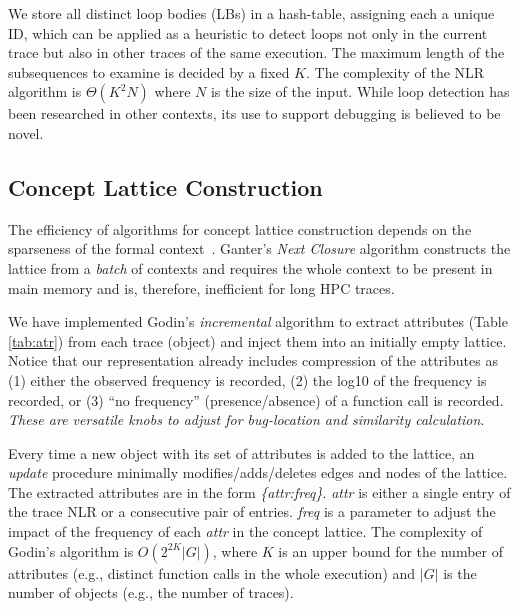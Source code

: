 We store all distinct loop bodies (LBs)
in a hash-table, assigning each a unique ID, which can be applied as
a heuristic to detect loops not only in the current trace but also in other
traces of the same execution.
%
The maximum length of the subsequences to examine is decided by a fixed $K$.
%
The complexity of the NLR algorithm is $\Theta(K^2N)$ where $N$ is the size of the input.
%
While loop detection has been researched in other contexts,
its use to support debugging is believed to be novel.

\subsection{Concept Lattice Construction}
\label{subsec:algo-cl}

%
The efficiency of algorithms for concept lattice construction
depends on the sparseness of the formal context~\cite{clgenperform}.
%
%
Ganter's \textit{Next Closure} algorithm \cite{clbook}
constructs the lattice from a
\textit{batch} of contexts and requires the whole context to be present in main memory and is, therefore, inefficient for long HPC traces.
%
%

%
We have implemented Godin's \textit{incremental} algorithm \cite{clconst}
to extract attributes (Table \ref{tab:atr})
from each trace (object) and inject them into an initially empty lattice.
%
Notice that our representation already includes compression of the attributes as (1) either the
observed frequency is recorded, (2) the log10 of the frequency is recorded, or (3) ``no frequency''
(presence/absence) of a function call is recorded.
%
{\em These are versatile knobs to adjust for bug-location and similarity calculation}.


Every time a new object with its set of attributes is added to the lattice,
an \textit{update} procedure minimally modifies/adds/deletes edges and nodes of the lattice.
%
%
The extracted attributes are in the form \textit{\{attr:freq\}}.
%
\textit{attr} is either a single entry of the trace NLR or a consecutive pair of entries.
\textit{freq} is a parameter to adjust the impact of the frequency of each \textit{attr}
in the concept lattice.
%
The complexity of Godin's algorithm is $O(2^{2K}|G|)$, where $K$ is an upper bound for the number of attributes (e.g., distinct function calls in the whole execution) and $|G|$ is the number of objects (e.g., the number of traces).




